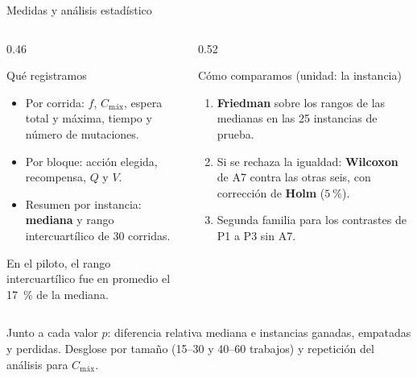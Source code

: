 \documentclass[aspectratio=169,11pt]{beamer}
\newcommand{\Cmax}{C_{\text{máx}}}
\begin{document}
\begin{frame}{Medidas y análisis estadístico}
  \begin{columns}[t]
    \begin{column}{0.46\textwidth}
      \begin{block}{Qué registramos}
        \small
        \begin{itemize}
          \item Por corrida: $f$, $\Cmax$, espera total y máxima, tiempo y número de mutaciones.
          \item Por bloque: acción elegida, recompensa, $Q$ y $V$.
          \item Resumen por instancia: \textbf{mediana} y rango intercuartílico de 30 corridas.
        \end{itemize}
        \vspace{0.05cm}
        \footnotesize En el piloto, el rango intercuartílico fue en promedio el 17~\% de la mediana.
      \end{block}
    \end{column}

    \begin{column}{0.52\textwidth}
      \begin{block}{Cómo comparamos (unidad: la instancia)}
        \small
        \begin{enumerate}
          \item \textbf{Friedman} sobre los rangos de las medianas en las 25 instancias de prueba.
          \item Si se rechaza la igualdad: \textbf{Wilcoxon} de A7 contra las otras seis, con corrección de \textbf{Holm} ($5~\%$).
          \item Segunda familia para los contrastes de P1 a P3 sin A7.
        \end{enumerate}
      \end{block}
    \end{column}
  \end{columns}

  \vspace{0.2cm}
  \centering
  \small
  Junto a cada valor $p$: diferencia relativa mediana e instancias ganadas, empatadas y perdidas. Desglose por tamaño (15--30 y 40--60 trabajos) y repetición del análisis para $\Cmax$.
\end{frame}
\end{document}
